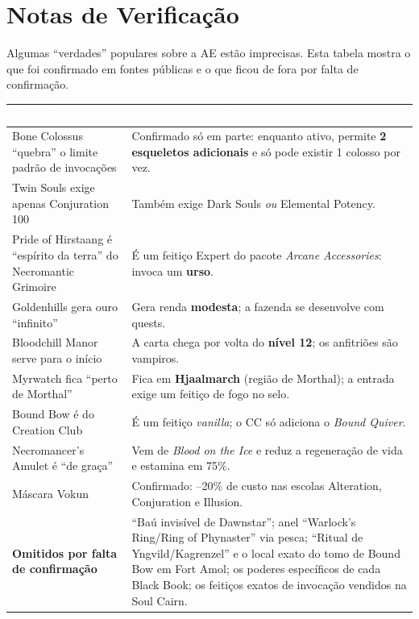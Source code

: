 \documentclass[11pt,a4paper,oneside,openany]{book}
\newcommand{\magia}[1]{\textit{\textcolor{SoulCairnPurple}{#1}}}
\newcommand{\perk}[1]{\textsf{\textcolor{SoulCairnPurple}{#1}}}
\newcommand{\cabec}[1]{\textcolor{white}{\sffamily\bfseries\small #1}}
\newcommand{\tabhead}{\rowcolor{NecroEmerald}}
\begin{document}
\chapter{Notas de Verificação}
Algumas ``verdades'' populares sobre a AE estão imprecisas. Esta tabela mostra o que foi confirmado em fontes públicas e o que ficou de fora por falta de confirmação.

\begin{center}
\small
{}
\begin{tabularx}{\linewidth}{@{}L{4.3cm}Y@{}}
\tabhead \cabec{Alegação comum} & \cabec{O que foi conferido} \\
\toprule
Bone Colossus ``quebra'' o limite padrão de invocações & Confirmado só em parte: enquanto ativo, permite \textbf{2 esqueletos adicionais} e só pode existir 1 colosso por vez. \\
Twin Souls exige apenas Conjuration 100 & Também exige \perk{Dark Souls} \emph{ou} \perk{Elemental Potency}. \\
Pride of Hirstaang é ``espírito da terra'' do Necromantic Grimoire & É um feitiço Expert do pacote \emph{Arcane Accessories}: invoca um \textbf{urso}. \\
Goldenhills gera ouro ``infinito'' & Gera renda \textbf{modesta}; a fazenda se desenvolve com quests. \\
Bloodchill Manor serve para o início & A carta chega por volta do \textbf{nível 12}; os anfitriões são vampiros. \\
Myrwatch fica ``perto de Morthal'' & Fica em \textbf{Hjaalmarch} (região de Morthal); a entrada exige um feitiço de fogo no selo. \\
Bound Bow é do Creation Club & É um feitiço \emph{vanilla}; o CC só adiciona o \magia{Bound Quiver}. \\
Necromancer's Amulet é ``de graça'' & Vem de \emph{Blood on the Ice} e reduz a regeneração de vida e estamina em 75\%. \\
Máscara Vokun & Confirmado: --20\% de custo nas escolas Alteration, Conjuration e Illusion. \\
\textbf{Omitidos por falta de confirmação} & ``Baú invisível de Dawnstar''; anel ``Warlock's Ring/Ring of Phynaster'' via pesca; ``Ritual de Yngvild/Kagrenzel'' e o local exato do tomo de Bound Bow em Fort Amol; os poderes específicos de cada Black Book; os feitiços exatos de invocação vendidos na Soul Cairn. \\
\bottomrule
\end{tabularx}
\end{center}
\end{document}
